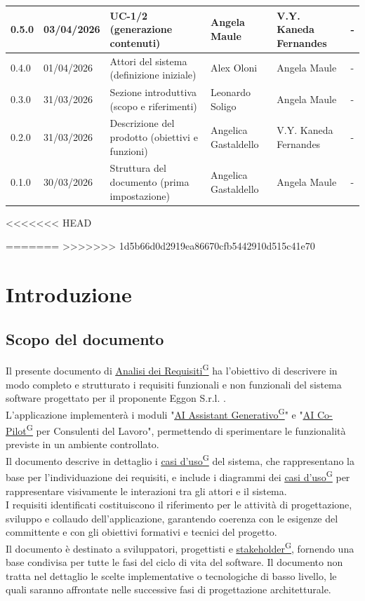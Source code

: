 ﻿\documentclass[a4paper,12pt]{article}
\providecommand{\glslink}[2]{\href{https://alittlebyte-19.github.io/Documentazione/glossario.html\#gls-#1}{\underline{#2}\textsuperscript{\scriptsize G}}}
\begin{document}
{\begin{longtable}{|p{1.2cm}|p{1.9cm}|p{4.3cm}|p{2.8cm}|p{2.1cm}|p{2.1cm}|}
    \hline
    \rowcolor{gray!8} 0.5.0 & 03/04/2026 & UC-1/2 (generazione contenuti) & Angela Maule & V.Y. Kaneda Fernandes & - \\
    \hline
    0.4.0 & 01/04/2026 & Attori del sistema (definizione iniziale) & Alex Oloni & Angela Maule & - \\
    \hline
    \rowcolor{gray!8} 0.3.0 & 31/03/2026 & Sezione introduttiva (scopo e riferimenti) & Leonardo Soligo & Angela Maule & - \\
    \hline
    0.2.0 & 31/03/2026 & Descrizione del prodotto (obiettivi e funzioni) & Angelica Gastaldello & V.Y. Kaneda Fernandes & - \\
    \hline
    \rowcolor{gray!8} 0.1.0 & 30/03/2026 & Struttura del documento (prima impostazione) & Angelica Gastaldello & Angela Maule & - \\
    \hline
\end{longtable}
}
<<<<<<< HEAD

=======
\newpage
>>>>>>> 1d5b66d0d2919ea86670cfb5442910d515c41e70
\tableofcontents

\listoffigures
\listoftables
{}
\setcounter{page}{5}
\section{Introduzione}
\subsection{Scopo del documento}
Il presente documento di \glslink{analisi-dei-requisiti-adr}{Analisi dei Requisiti} ha l'obiettivo di descrivere in modo completo e strutturato i requisiti funzionali e non funzionali del sistema software progettato per il proponente Eggon S.r.l. .\\
L'applicazione implementerà i moduli "\glslink{ai-assistant-generativo}{AI Assistant Generativo}" e "\glslink{ai-co-pilot-per-consulenti-del-lavoro-cdl}{AI Co-Pilot} per Consulenti del Lavoro", permettendo di sperimentare le funzionalità previste in un ambiente controllato.\\
Il documento descrive in dettaglio i \glslink{caso-d-uso-uc}{casi d'uso} del sistema, che rappresentano la base per l'individuazione dei requisiti, e include i diagrammi dei \glslink{caso-d-uso-uc}{casi d'uso} per rappresentare visivamente le interazioni tra gli attori e il sistema. \\
I requisiti identificati costituiscono il riferimento per le attività di progettazione, sviluppo e collaudo dell'applicazione, garantendo coerenza con le esigenze del committente e con gli obiettivi formativi e tecnici del progetto. \\
Il documento è destinato a sviluppatori, progettisti e \glslink{stakeholder}{stakeholder}, fornendo una base condivisa per tutte le fasi del ciclo di vita del software.
Il documento non tratta nel dettaglio le scelte implementative o tecnologiche di basso livello, le quali saranno affrontate nelle successive fasi di progettazione architetturale.
\end{document}
